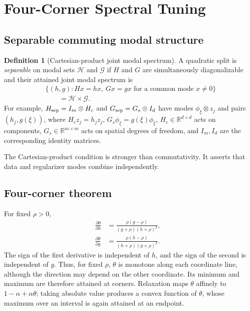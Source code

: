 \documentclass[pdflatex,iicol,sn-mathphys-num]{sn-jnl}
\theoremstyle{definition}
\newtheorem{definition}[theorem]{Definition}
\newcommand{\R}{\mathbb{R}}
\begin{document}
\section{Four-Corner Spectral Tuning}\label{sec:fourcorner}
\subsection{Separable commuting modal structure}
\begin{definition}[Cartesian-product joint modal spectrum]\label{def:cartesian}
A quadratic split is \emph{separable} on modal sets
$\mathcal H$ and $\mathcal G$ if $H$ and $G$ are simultaneously diagonalizable
and their attained joint modal spectrum is
\begin{equation}
\begin{aligned}
&\{(h,g): Hx=hx,\ Gx=gx\text{ for a common mode }x\ne0\}\\
&\qquad=\mathcal H\times\mathcal G.
\end{aligned}
\end{equation}
For example,
$H_{\rm sep}=I_m\otimes H_c$ and
$G_{\rm sep}=G_s\otimes I_d$ have modes
$\phi_\xi\otimes z_j$ and pairs $(h_j,g(\xi))$, where
$H_cz_j=h_jz_j$, $G_s\phi_\xi=g(\xi)\phi_\xi$,
$H_c\in\R^{d\times d}$ acts on components,
$G_s\in\R^{m\times m}$ acts on spatial degrees of freedom, and $I_m,I_d$ are
the corresponding identity matrices.
\end{definition}
The Cartesian-product condition is stronger than commutativity. It asserts
that data and regularizer modes combine independently.

\subsection{Four-corner theorem}
For fixed $\rho>0$,
\begin{align}
\frac{\partial\theta}{\partial h}
&=\frac{\rho(g-\rho)}{(g+\rho)(h+\rho)^2},\nonumber\\
\frac{\partial\theta}{\partial g}
&=\frac{\rho(h-\rho)}{(h+\rho)(g+\rho)^2}.
\label{eq:theta_derivatives}
\end{align}
The sign of the first derivative is independent of $h$, and the sign of the
second is independent of $g$. Thus, for fixed $\rho$, $\theta$ is monotone
along each coordinate line, although the direction may depend on the other
coordinate. Its minimum and maximum are therefore attained at corners.
Relaxation maps $\theta$ affinely to
$1-\alpha+\alpha\theta$; taking absolute value produces a convex function of
$\theta$, whose maximum over an interval is again attained at an endpoint.
\end{document}
